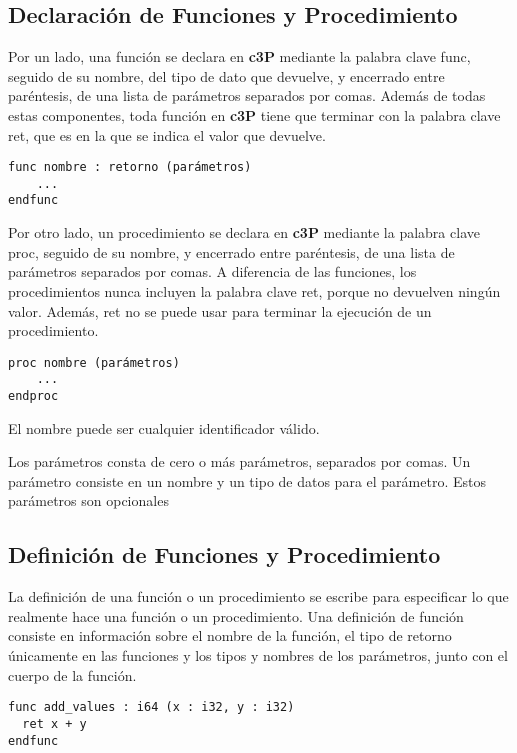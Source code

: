 \subsection{Declaración de Funciones y Procedimiento}

Por un lado, una función se declara en \textbf{c3P} mediante la palabra clave func,
seguido de su nombre, del tipo de dato que devuelve, y encerrado entre paréntesis,
de una lista de parámetros separados por comas. Además de todas estas componentes,
toda función en \textbf{c3P} tiene que terminar con la palabra clave ret, que es
en la que se indica el valor que devuelve.

\begin{verbatim}
func nombre : retorno (parámetros)
    ...
endfunc
\end{verbatim}

Por otro lado, un procedimiento se declara en \textbf{c3P} mediante la palabra clave proc,
seguido de su nombre, y encerrado entre paréntesis, de una lista de parámetros separados
por comas. A diferencia de las funciones, los procedimientos nunca incluyen la palabra
clave ret, porque no devuelven ningún valor. Además, ret no se puede usar para terminar
la ejecución de un procedimiento.

\begin{verbatim}
proc nombre (parámetros)
    ...
endproc
\end{verbatim}

El nombre puede ser cualquier identificador válido.

Los parámetros consta de cero o más parámetros, separados por comas. Un parámetro  consiste en un nombre y un tipo de datos para el parámetro. Estos parámetros son opcionales

\subsection{Definición de Funciones y Procedimiento}

La definición de una función o un procedimiento se escribe para especificar lo que realmente hace una función o un procedimiento. Una definición de función consiste en información sobre el nombre de la función, el tipo de retorno únicamente en las funciones y los tipos y nombres de los parámetros, junto con el cuerpo de la función.

\begin{verbatim}
func add_values : i64 (x : i32, y : i32)
  ret x + y
endfunc
\end{verbatim}

